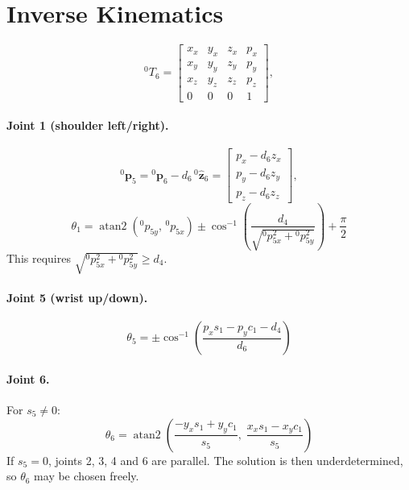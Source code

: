 \documentclass[11pt]{article}
\begin{document}
\section{Inverse Kinematics}

\begin{equation}
  {}^{0}T_6=\begin{bmatrix}
    x_x & y_x & z_x & p_x\\
    x_y & y_y & z_y & p_y\\
    x_z & y_z & z_z & p_z\\
    0&0&0&1
  \end{bmatrix},
\end{equation}

\paragraph{Joint 1 (shoulder left/right).}
\begin{equation}
  {}^{0}\mathbf p_5 = {}^{0}\mathbf p_6 - d_6\,{}^{0}\hat{\mathbf z}_6
  =\begin{bmatrix}p_x-d_6z_x\\ p_y-d_6z_y\\ p_z-d_6z_z\end{bmatrix},
\end{equation}
\begin{equation}
  \boxed{\;
  \theta_1=\operatorname{atan2}\!\left({}^{0}p_{5y},\,{}^{0}p_{5x}\right)
  \pm\cos^{-1}\!\left(\frac{d_4}{\sqrt{{}^{0}p_{5x}^{2}+{}^{0}p_{5y}^{2}}}\right)
  +\frac{\pi}{2}
  \;}
\end{equation}
This requires $\sqrt{{}^{0}p_{5x}^{2}+{}^{0}p_{5y}^{2}}\ge d_4$.

\paragraph{Joint 5 (wrist up/down).}
\begin{equation}
  \boxed{\;
  \theta_5=\pm\cos^{-1}\!\left(\frac{p_x s_1-p_y c_1-d_4}{d_6}\right)
  \;}
\end{equation}

\paragraph{Joint 6.}
For $s_5\neq0$:
\begin{equation}
  \boxed{\;
  \theta_6=\operatorname{atan2}\!\left(
    \frac{-y_x s_1 + y_y c_1}{s_5},\;
    \frac{x_x s_1 - x_y c_1}{s_5}\right)
  \;}
\end{equation}
If $s_5=0$, joints 2, 3, 4 and 6 are parallel. The solution is then
underdetermined, so $\theta_6$ may be chosen freely.
\end{document}
